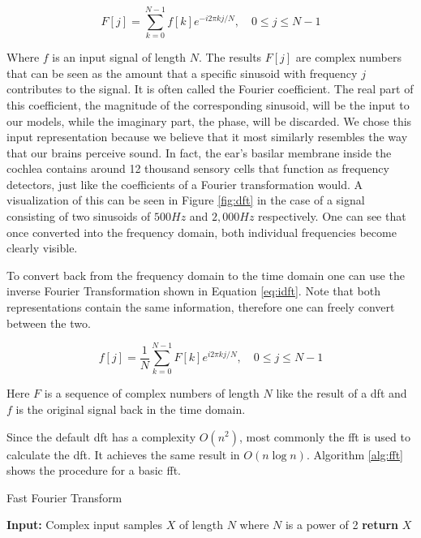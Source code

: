 \begin{equation}
    \label{eq:dft}
    F[j] = \sum_{k=0}^{N-1} f[k]e^{-i 2 \pi k j / N},\quad 0 \leq j \leq N - 1
\end{equation}

Where $f$ is an input signal of length $N$. The results $F[j]$ are complex numbers that can be seen as the amount that a specific sinusoid with frequency $j$ contributes to the signal. It is often called the Fourier coefficient. The real part of this coefficient, the magnitude of the corresponding sinusoid, will be the input to our models, while the imaginary part, the phase, will be discarded. We chose this input representation because we believe that it most similarly resembles the way that our brains perceive sound. In fact, the ear's basilar membrane inside the cochlea contains around 12 thousand sensory cells that function as frequency detectors, just like the coefficients of a Fourier transformation would. A visualization of this can be seen in Figure \ref{fig:dft} in the case of a signal consisting of two sinusoids of $500Hz$ and $2,000Hz$ respectively. One can see that once converted into the frequency domain, both individual frequencies become clearly visible.

To convert back from the frequency domain to the time domain one can use the inverse Fourier Transformation shown in Equation \ref{eq:idft}. Note that both representations contain the same information, therefore one can freely convert between the two.

\begin{equation}\label{eq:idft}
    f[j] = \frac{1}{N} \sum_{k=0}^{N-1} F[k]e^{i 2 \pi k j / N},\quad 0 \leq j \leq N - 1
\end{equation}

Here $F$ is a sequence of complex numbers of length $N$ like the result of a \gls{dft} and $f$ is the original signal back in the time domain.

Since the default \gls{dft} has a complexity $O(n^2)$, most commonly the \gls{fft} is used to calculate the \gls{dft}. It achieves the same result in $O(n \log n)$. Algorithm \ref{alg:fft} shows the procedure for a basic \gls{fft}.

\begin{algorithm}[htbp]
  \caption{Fast Fourier Transform}
  \label{alg:fft}
  \begin{algorithmic}[1]
  \State \textbf{Input:} Complex input samples $X$ of length $N$ where $N$ is a power of 2
			\EndFor
		\EndFor
	\EndFor
	\State \textbf{return} $X$
  \end{algorithmic}
\end{algorithm}


